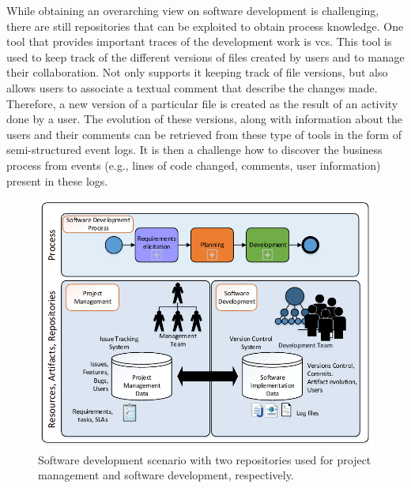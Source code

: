

While obtaining an overarching view on software development is challenging, there are still repositories that can be exploited to obtain process knowledge. One tool that provides important traces of the development work is \gls{vcs}. This tool is used to keep track of the different versions of files created by users and to manage their collaboration. Not only supports it keeping track of file versions, but also allows users to associate a textual comment that describe the changes made. Therefore, a new version of a particular file is created as the result of an activity done by a user. The evolution of these versions, along with information about the users and their comments can be retrieved from these type of tools in the form of semi-structured event logs. It is then a challenge how to discover the business process from events (e.g., lines of code changed, comments, user information) present in these logs.

%


\begin{figure}[h]
	\centering
	\includegraphics[width=\linewidth]{figures/big-picture}
	\caption{Software development scenario with two repositories used for project management and software development, respectively.}
	\label{fig:big-picture-sd}
\end{figure}

